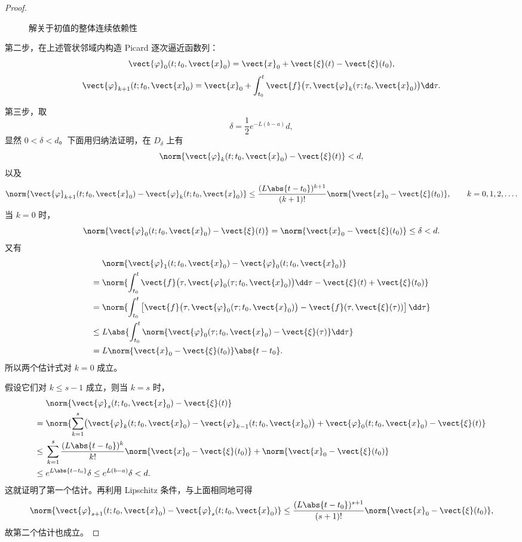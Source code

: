 \begin{proof}
\begin{figure}[htbp]
		\caption{解关于初值的整体连续依赖性}
		\label{fig:解关于初值的整体连续依赖性}
	\end{figure}

	第二步，在上述管状邻域内构造 Picard 逐次逼近函数列：
	\[
		\vect{\varphi}_0(t;t_0,\vect{x}_0)
		=\vect{x}_0+\vect{\xi}(t)-\vect{\xi}(t_0),
	\]
	\[
		\vect{\varphi}_{k+1}(t;t_0,\vect{x}_0)
		=\vect{x}_0+
		\int_{t_0}^t
		\vect{f}\bigl(
		\tau,\vect{\varphi}_k(\tau;t_0,\vect{x}_0)
		\bigr)\dd\tau.
	\]

	第三步，取
	\[
		\delta=\dfrac{1}{2}e^{-L(b-a)}d,
	\]
	显然 $0<\delta<d$。下面用归纳法证明，在 $D_\delta$ 上有
	\[
		\norm{
		\vect{\varphi}_k(t;t_0,\vect{x}_0)-\vect{\xi}(t)
		}<d,
	\]
	以及
	\[
		\norm{
		\vect{\varphi}_{k+1}(t;t_0,\vect{x}_0)
		-\vect{\varphi}_k(t;t_0,\vect{x}_0)
		}
		\leq
		\dfrac{(L\abs{t-t_0})^{k+1}}{(k+1)!}
		\norm{\vect{x}_0-\vect{\xi}(t_0)},
		\qquad k=0,1,2,\ldots.
	\]
	当 $k=0$ 时，
	\[
		\norm{
		\vect{\varphi}_0(t;t_0,\vect{x}_0)-\vect{\xi}(t)
		}
		=\norm{\vect{x}_0-\vect{\xi}(t_0)}
		\leq\delta<d.
	\]
	又有
	\begin{align*}
		&\norm{
		\vect{\varphi}_1(t;t_0,\vect{x}_0)
		-\vect{\varphi}_0(t;t_0,\vect{x}_0)
		}\\
		={}&\norm{
		\int_{t_0}^t
		\vect{f}\bigl(\tau,\vect{\varphi}_0(\tau;t_0,\vect{x}_0)\bigr)
		\dd\tau-\vect{\xi}(t)+\vect{\xi}(t_0)
		}\\
		={}&\norm{
		\int_{t_0}^t
		\left[
		\vect{f}\bigl(\tau,\vect{\varphi}_0(\tau;t_0,\vect{x}_0)\bigr)
		-\vect{f}(\tau,\vect{\xi}(\tau))
		\right]\dd\tau
		}\\
		\leq{}&L\abs{
		\int_{t_0}^t
		\norm{
		\vect{\varphi}_0(\tau;t_0,\vect{x}_0)-\vect{\xi}(\tau)
		}\dd\tau
		}\\
		={}&L\norm{\vect{x}_0-\vect{\xi}(t_0)}\abs{t-t_0}.
	\end{align*}
	所以两个估计式对 $k=0$ 成立。

	假设它们对 $k\leq s-1$ 成立，则当 $k=s$ 时，
	\begin{align*}
		&\norm{
		\vect{\varphi}_s(t;t_0,\vect{x}_0)-\vect{\xi}(t)
		}\\
		={}&\norm{
		\sum_{k=1}^s
		\bigl(
		\vect{\varphi}_k(t;t_0,\vect{x}_0)
		-\vect{\varphi}_{k-1}(t;t_0,\vect{x}_0)
		\bigr)
		+\vect{\varphi}_0(t;t_0,\vect{x}_0)-\vect{\xi}(t)
		}\\
		\leq{}&
		\sum_{k=1}^s
		\dfrac{(L\abs{t-t_0})^k}{k!}
		\norm{\vect{x}_0-\vect{\xi}(t_0)}
		+\norm{\vect{x}_0-\vect{\xi}(t_0)}\\
		\leq{}&e^{L\abs{t-t_0}}\delta
		\leq e^{L(b-a)}\delta<d.
	\end{align*}
	这就证明了第一个估计。再利用 Lipschitz 条件，与上面相同地可得
	\[
		\norm{
		\vect{\varphi}_{s+1}(t;t_0,\vect{x}_0)
		-\vect{\varphi}_s(t;t_0,\vect{x}_0)
		}
		\leq
		\dfrac{(L\abs{t-t_0})^{s+1}}{(s+1)!}
		\norm{\vect{x}_0-\vect{\xi}(t_0)},
	\]
	故第二个估计也成立。


\end{proof}
